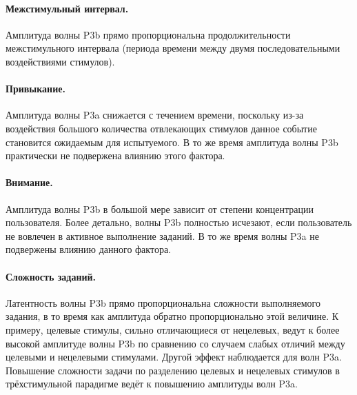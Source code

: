 \documentclass[12pt,a4paper,oneside,fleqn,leqno]{article}
\newcounter{pe} %
\begin{document}
	\paragraph{Межстимульный интервал.} Амплитуда волны P3b прямо пропорциональна продолжительности межстимульного интервала (периода времени между двумя последовательными воздействиями стимулов).
	\paragraph{Привыкание.} Амплитуда волны P3a снижается с течением времени, поскольку из-за воздействия большого количества отвлекающих стимулов данное событие становится ожидаемым для испытуемого. В то же время амплитуда волны P3b практически не подвержена влиянию этого фактора.
	\paragraph{Внимание.} Амплитуда волны P3b в большой мере зависит от степени концентрации пользователя. Более детально, волны P3b полностью исчезают, если пользователь не вовлечен в активное выполнение заданий. В то же время волны P3a не подвержены влиянию данного фактора.
	\paragraph{Сложность заданий.} Латентность волны P3b прямо пропорциональна сложности выполняемого  задания, в то время как амплитуда обратно пропорционально этой величине. К примеру, целевые стимулы, сильно отличающиеся от нецелевых, ведут к более высокой амплитуде волны P3b по сравнению со случаем слабых отличий между целевыми и нецелевыми стимулами.  Другой эффект наблюдается для волн P3a. Повышение сложности задачи по разделению целевых и нецелевых стимулов в трёхстимульной парадигме ведёт к повышению амплитуды волн P3a.
	
\end{document}

